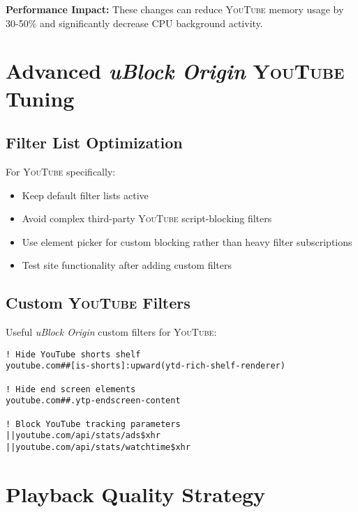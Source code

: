 \documentclass[11pt,a4paper,oneside]{book}
\newcommand{\youtube}{\textsc{YouTube}}
\newcommand{\extension}[1]{\textit{\color{primaryblue}#1}}
\begin{document}
\begin{tipbox}
\textbf{Performance Impact:} These changes can reduce \youtube{} memory usage by 30-50\% and significantly decrease CPU background activity.
\end{tipbox}

\section{Advanced \extension{uBlock Origin} \youtube{} Tuning}

\subsection{Filter List Optimization}

For \youtube{} specifically:

\begin{itemize}
    \item Keep default filter lists active
    \item Avoid complex third-party \youtube{} script-blocking filters
    \item Use element picker for custom blocking rather than heavy filter subscriptions
    \item Test site functionality after adding custom filters
\end{itemize}

\subsection{Custom \youtube{} Filters}

Useful \extension{uBlock Origin} custom filters for \youtube{}:

\begin{codebox}
\begin{lstlisting}
! Hide YouTube shorts shelf
youtube.com##[is-shorts]:upward(ytd-rich-shelf-renderer)

! Hide end screen elements
youtube.com##.ytp-endscreen-content

! Block YouTube tracking parameters
||youtube.com/api/stats/ads$xhr
||youtube.com/api/stats/watchtime$xhr
\end{lstlisting}
\end{codebox}

\section{Playback Quality Strategy}
\end{document}
